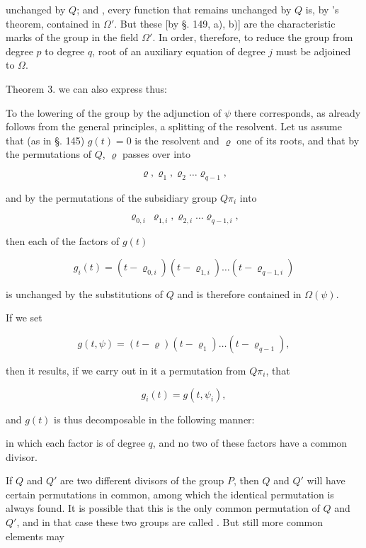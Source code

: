 unchanged by $Q$; and , every function that remains
unchanged by $Q$ is, by 's theorem, contained
in $\Omega'$. But these [by §. 149, a), b)] are the characteristic
marks of the  group in the field $\Omega'$.
In order, therefore, to reduce the  group from degree $p$ to degree $q$,
 root of an auxiliary equation of degree $j$
must be adjoined to $\Omega$.

Theorem 3. we can also express thus:


To the lowering of the group by the adjunction of $\psi$ there corresponds,
as already follows from the general principles,
a splitting of the  resolvent. Let us assume
that (as in §. 145) $g(t) = 0$ is the  resolvent and
$\varrho$ one of its roots, and that by the permutations of $Q$,
$\varrho$ passes over into

\[
\varrho, \varrho_1, \varrho_2 \ldots \varrho_{q-1},
\]

and by the permutations of the subsidiary group $Q\pi_i$ into

\[
\varrho_{0,i}\ \varrho_{1,i}, \varrho_{2,i} \ldots \varrho_{q-1,i},
\]

then each of the factors of $g(t)$

\[
g_i(t) = (t - \varrho_{0,i})(t - \varrho_{1,i}) \ldots (t - \varrho_{q-1,i})
\]

is unchanged by the substitutions of $Q$ and is therefore contained in $\Omega(\psi)$.

If we set

\[
g(t, \psi) = (t - \varrho)(t - \varrho_1) \ldots (t - \varrho_{q-1}),
\]

then it results, if we carry out in it a permutation from $Q\pi_i$,
that

\[
g_i(t) = g(t, \psi_i),
\]

and $g(t)$ is thus decomposable in the following manner:


in which each factor is of degree $q$, and no two of these
factors have a common divisor.

If $Q$ and $Q'$ are two different divisors of the group $P$, then
$Q$ and $Q'$ will have certain permutations in common, among
which the identical permutation is always found. It is
possible that this is the only common permutation of $Q$
and $Q'$, and in that case these two groups are called .
But still more common elements may
